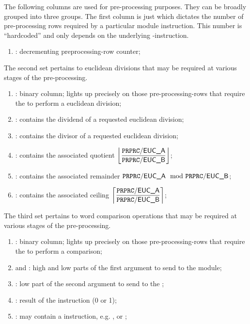 The following columns are used for pre-processing purposes.
They can be broadly grouped into three groups.
The first column is just \ppCt{} which dictates the number of pre-processing rows required by a particular \mmuMod{} module instruction.
This number is ``hardcoded'' and only depends on the underlying \mmuMod{}-instruction.
\begin{enumerate}
	\item \ppCt:
		decrementing preprocessing-row counter;
\end{enumerate}
The second set pertains to euclidean divisions that may be required at various stages of the pre-processing.
\begin{enumerate}[resume]
	\item \ppEucFlag:
		binary column;
		lights up precisely on those pre-processing-rows that require the \eucMod{} to perform a euclidean division;
	\item \ppEucA:
		contains the dividend of a requested euclidean division;
	\item \ppEucB:
		contains the divisor of a requested euclidean division;
	\item \ppEucQuot:
		contains the associated quotient $\displaystyle \left\lfloor \frac{\texttt{PRPRC}\textsf{/}{\textsf{\textsf{EUC}\_A}}}{\texttt{PRPRC}\textsf{/}{\textsf{\textsf{EUC}\_B}}} \right\rfloor$;
	\item \ppEucRem:
		contains the associated remainder $\texttt{PRPRC}\textsf{/}{\textsf{\textsf{EUC}\_A}} \mod {\texttt{PRPRC}\textsf{/}{\textsf{\textsf{EUC}\_B}}}$;
	\item \ppEucCeil:
		contains the associated ceiling $\displaystyle \left\lceil \frac{\texttt{PRPRC}\textsf{/}{\textsf{\textsf{EUC}\_A}}}{\texttt{PRPRC}\textsf{/}{\textsf{\textsf{EUC}\_B}}} \right\rceil$;
\end{enumerate}
The third set pertains to word comparison operations that may be required at various stages of the pre-processing.
\begin{enumerate}[resume]
	\item \ppWcpFlag:
		binary column;
		lights up precisely on those pre-processing-rows that require the \wcpMod{} to perform a comparison;
	\item \ppWcpArgOneHi{} and \ppWcpArgOneLo{}:
		high and low parts of the first argument to send to the \wcpMod{} module;
	\item \ppWcpArgTwoLo{}:
		low part of the second argument to send to the \wcpMod;
	\item \ppWcpRes:
		result of the instruction (0 or 1);
	\item \ppWcpInst:
		may contain a \wcpMod{} instruction, e.g. ,  or ;
\end{enumerate}
